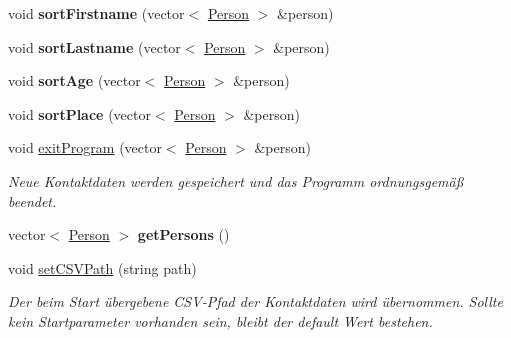 \begin{DoxyCompactItemize}
void {\bfseries sort\+Firstname} (vector$<$ \hyperlink{classContactManager_1_1Person}{Person} $>$ \&person)
\item 
\mbox{\label{classContactManager_1_1Controller_aa1fcf8d4e6f52ae88a41d5888afdf331}} 
void {\bfseries sort\+Lastname} (vector$<$ \hyperlink{classContactManager_1_1Person}{Person} $>$ \&person)
\item 
\mbox{\label{classContactManager_1_1Controller_a9ec4f292e940b9962e6cc6e80f39e784}} 
void {\bfseries sort\+Age} (vector$<$ \hyperlink{classContactManager_1_1Person}{Person} $>$ \&person)
\item 
\mbox{\label{classContactManager_1_1Controller_acceb277521fa46c74131b41c937e0dd4}} 
void {\bfseries sort\+Place} (vector$<$ \hyperlink{classContactManager_1_1Person}{Person} $>$ \&person)
\item 
void \hyperlink{classContactManager_1_1Controller_a5c039c4de9d2bb309b6c212c162b115c}{exit\+Program} (vector$<$ \hyperlink{classContactManager_1_1Person}{Person} $>$ \&person)
\begin{DoxyCompactList}\small\item\em Neue Kontaktdaten werden gespeichert und das Programm ordnungsgemäß beendet.\end{DoxyCompactList}\item 
\mbox{\label{classContactManager_1_1Controller_a487e6797ca3e968830fea9e0cd8d8faa}} 
vector$<$ \hyperlink{classContactManager_1_1Person}{Person} $>$ {\bfseries get\+Persons} ()
\item 
void \hyperlink{classContactManager_1_1Controller_a36ae8467ae2a00a693de08f3be42cda4}{set\+C\+S\+V\+Path} (string path)
\begin{DoxyCompactList}\small\item\em Der beim Start übergebene C\+S\+V-\/\+Pfad der Kontaktdaten wird übernommen. Sollte kein Startparameter vorhanden sein, bleibt der default Wert bestehen.\end{DoxyCompactList}\end{DoxyCompactItemize}
